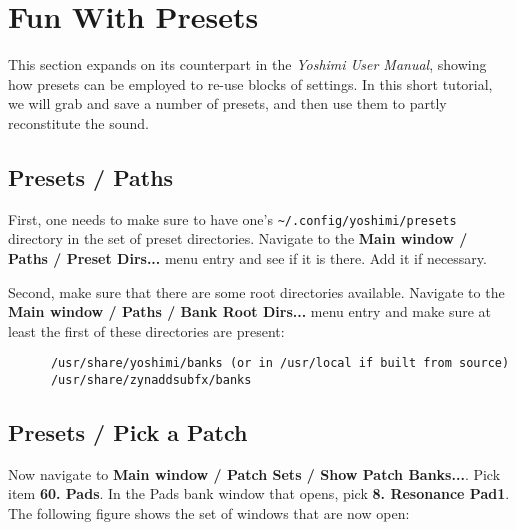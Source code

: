 %
%
%

\section{Fun With Presets}
\label{sec:presets}

   This section expands on its counterpart in the  \textsl{Yoshimi User Manual},
   showing how presets can be employed to re-use blocks of settings.
   In this short tutorial, we will grab and save a number of presets,
   and then use them to partly reconstitute the sound.

\subsection{Presets / Paths}
\label{subsec:presets_paths}

   First, one needs to make sure to have one's
   \texttt{\textasciitilde/.config/yoshimi/presets} directory
   in the set of preset directories.
   Navigate to the \textbf{Main window / Paths / Preset Dirs...} menu entry
   and see if it is there.
   Add it if necessary.

   Second, make sure that there are some root directories available.
   Navigate to the \textbf{Main window / Paths / Bank Root Dirs...} menu entry
   and make sure at least the first of these directories are present:

   \begin{verbatim}
      /usr/share/yoshimi/banks (or in /usr/local if built from source)
      /usr/share/zynaddsubfx/banks
   \end{verbatim}

\subsection{Presets / Pick a Patch}
\label{subsec:presets_pick_a_patch}

   Now navigate to
   \textbf{Main window / Patch Sets / Show Patch Banks...}.
   Pick item \textbf{60. Pads}.
   In the Pads bank window that opens, pick \textbf{8. Resonance Pad1}.
   The following figure shows the set of windows that are now open:

